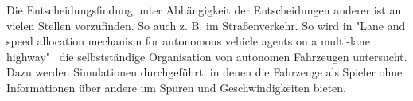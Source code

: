 \documentclass[a4paper,11pt]{article}
\theoremstyle{definition}
\theoremstyle{plain}
\theoremstyle{definition}
\begin{document}
Die Entscheidungsfindung unter Abhängigkeit der Entscheidungen anderer ist an vielen Stellen vorzufinden. So auch z. B. im Straßenverkehr. So wird in "Lane and speed allocation mechanism for autonomous vehicle agents on a multi-lane highway"~\cite{lov21} die selbstständige Organisation von autonomen Fahrzeugen untersucht. Dazu werden Simulationen durchgeführt, in denen die Fahrzeuge als Spieler ohne Informationen über andere um Spuren und Geschwindigkeiten bieten.



\end{document}
